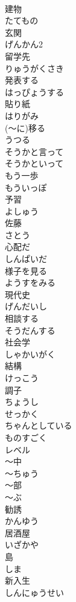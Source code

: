 \documentclass[8pt]{extreport}
\begin{document}
\begin{CJK}{UTF8}{min}
\\	建物	
\\	たてもの
\\	玄関	
\\	げんかん2
\\	留学先	
\\	りゅうがくさき
\\	発表する	
\\	はっぴょうする
\\	貼り紙	
\\	はりがみ
\\	(～に)移る	
\\	うつる
\\	そうかと言って	
\\	そうかといって
\\	もう一歩	
\\	もういっぽ
\\	予習	
\\	よしゅう
\\	佐藤	
\\	さとう
\\	心配だ	
\\	しんぱいだ
\\	様子を見る	
\\	ようすをみる
\\	現代史	
\\	げんだいし
\\	相談する	
\\	そうだんする
\\	社会学	
\\	しゃかいがく
\\	結構	
\\	けっこう
\\	調子	
\\	ちょうし
\\	せっかく	
\\	ちゃんとしている	
\\	ものすごく	
\\	レベル	
\\	～中	
\\	～ちゅう
\\	～部	
\\	～ぶ
\\	勧誘	
\\	かんゆう
\\	居酒屋	
\\	いざかや
\\	島	
\\	しま
\\	新入生	
\\	しんにゅうせい

\end{CJK}
\end{document}
